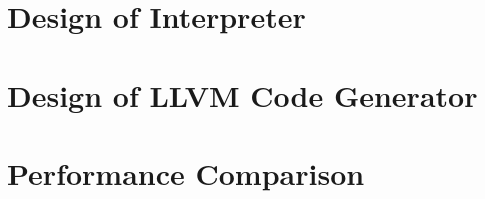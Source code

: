 \documentclass[12pt]{report}
\begin{document}
\section*{Design of Interpreter}
\section*{Design of LLVM Code Generator}
\section*{Performance Comparison}

% 
% 
% 
% 
% 
\end{document}
